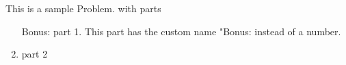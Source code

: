 
\begin{problem}
This is a sample Problem. with parts
\begin{enumerate}
\item[Bonus:] part 1. This part has the custom name "Bonus:
 instead of a number.
\item part 2
\end{enumerate}
\end{problem}

\begin{solution}
  
\end{solution}

 	

